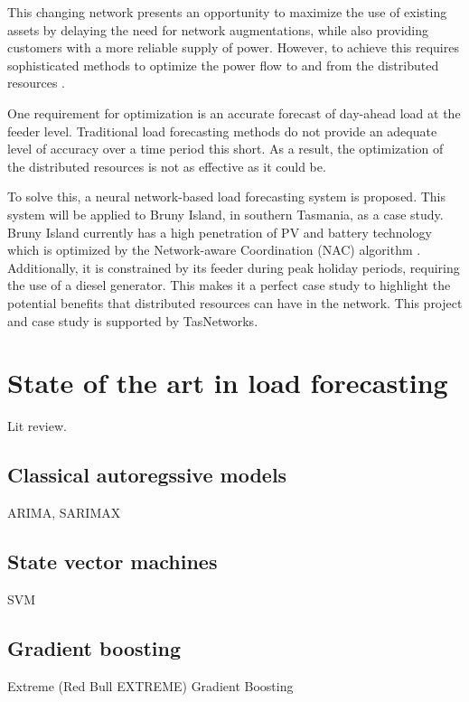 This changing network presents an opportunity to maximize the use of existing assets by delaying the need for network augmentations, while also providing customers with a more reliable supply of power.
However, to achieve this requires sophisticated methods to optimize the power flow to and from the distributed resources \cite{Scott2014}.
\par
One requirement for optimization is an accurate forecast of day-ahead load at the feeder level.
Traditional load forecasting methods do not provide an adequate level of accuracy over a time period this short.
As a result, the optimization of the distributed resources is not as effective as it could be.
\par
To solve this, a neural network-based load forecasting system is proposed.
This system will be applied to Bruny Island, in southern Tasmania, as a case study.
Bruny Island currently has a high penetration of PV and battery technology which is optimized by the Network-aware Coordination (NAC) algorithm \cite{Evan2016}.
Additionally, it is constrained by its feeder during peak holiday periods, requiring the use of a diesel generator.
This makes it a perfect case study to highlight the potential benefits that distributed resources can have in the network.
This project and case study is supported by TasNetworks.

\section{State of the art in load forecasting}
Lit review.

\subsection{Classical autoregssive models}
ARIMA, SARIMAX

\subsection{State vector machines}
SVM

\subsection{Gradient boosting}
Extreme (Red Bull EXTREME) Gradient Boosting

